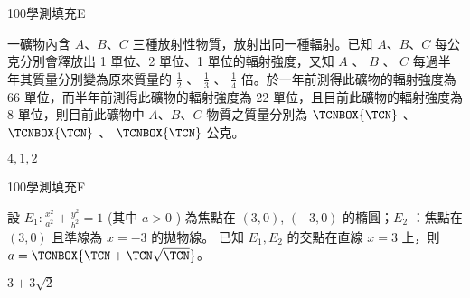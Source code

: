     \begin{QUESTION}
        \begin{ExamInfo}{100}{學測}{填充}{E}
        \end{ExamInfo}
        \begin{ExamAnsRateInfo}{26}{59}{17}{2}
        \end{ExamAnsRateInfo}
        \begin{QBODY}
            一礦物內含 $A$、$B$、$C$ 三種放射性物質，放射出同一種輻射。已知 $A$、$B$、$C$ 每公克分別會釋放出 1 單位、2 單位、1 單位的輻射強度，又知 $A$ 、 $B$ 、 $C$ 每過半年其質量分別變為原來質量的  $\frac{1}{2}$ 、 $\frac{1}{3}$ 、 $\frac{1}{4}$ 倍。於一年前測得此礦物的輻射強度為 66 單位，而半年前測得此礦物的輻射強度為 22 單位，且目前此礦物的輻射強度為 8 單位，則目前此礦物中 $A$、$B$、$C$ 物質之質量分別為 $\TCNBOX{\TCN}$ 、 $\TCNBOX{\TCN}$ 、 $\TCNBOX{\TCN}$ 公克。
        \end{QBODY}
        \begin{QFROMS}
        \end{QFROMS}
        \begin{QTAGS}\end{QTAGS}
        \begin{QANS}
            $4,1,2$
        \end{QANS}
        \begin{QSOLLIST}
        \end{QSOLLIST}
        \begin{QEMPTYSPACE}
        \end{QEMPTYSPACE}
    \end{QUESTION}
    \begin{QUESTION}
        \begin{ExamInfo}{100}{學測}{填充}{F}
        \end{ExamInfo}
        \begin{ExamAnsRateInfo}{27}{66}{14}{1}
        \end{ExamAnsRateInfo}
        \begin{QBODY}
            設 $E_1:  \frac{x^2}{a^2} +\frac{y^2}{b^2} =1$ (其中 $a>0$ ) 為焦點在 $(3,0)$, $(-3,0)$ 的橢圓；$E_2$ ：焦點在 $(3, 0)$ 且準線為 $x = -3$ 的拋物線。 已知 $E_1, E_2$ 的交點在直線 $x=3$ 上，則 $a=\TCNBOX{\TCN+\TCN\sqrt{\TCN}}$。
        \end{QBODY}
        \begin{QFROMS}
        \end{QFROMS}
        \begin{QTAGS}\end{QTAGS}
        \begin{QANS}
            $3+3\sqrt{2}$
        \end{QANS}
        \begin{QSOLLIST}
        \end{QSOLLIST}
        \begin{QEMPTYSPACE}
        \end{QEMPTYSPACE}
    \end{QUESTION}

